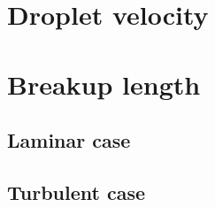 \section{Droplet velocity}

\section{Breakup length}

\subsection{Laminar case}

\subsection{Turbulent case}


